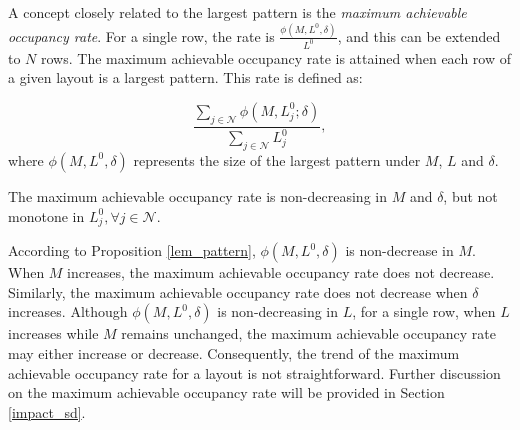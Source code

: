A concept closely related to the largest pattern is the \textit{maximum achievable occupancy rate}.
For a single row, the rate is $\frac{\phi(M, L^{0}, \delta)}{L^{0}}$, and this can be extended to $N$ rows. The maximum achievable occupancy rate is attained when each row of a given layout is a largest pattern. This rate is defined as:

$$\frac{\sum_{j \in \mathcal{N}}\phi(M, L_{j}^{0}; \delta)}{\sum_{j \in \mathcal{N}} L_{j}^{0}},$$
where $\phi(M, L^{0}, \delta)$ represents the size of the largest pattern under $M$, $L$ and $\delta$.

\begin{corollary}\label{maximum_phi}
The maximum achievable occupancy rate is non-decreasing in $M$ and $\delta$, but not monotone in $L_{j}^{0}, \forall j \in \mathcal{N}$.
\end{corollary}


According to Proposition \ref{lem_pattern}, $\phi(M, L^{0}, \delta)$ is non-decrease in $M$. When $M$ increases, the maximum achievable occupancy rate does not decrease. Similarly, the maximum achievable occupancy rate does not decrease when $\delta$ increases. Although $\phi(M, L^{0}, \delta)$ is non-decreasing in $L$, for a single row, when $L$ increases while $M$ remains unchanged, the maximum achievable occupancy rate may either increase or decrease. Consequently, the trend of the maximum achievable occupancy rate for a layout is not straightforward. Further discussion on the maximum achievable occupancy rate will be provided in Section \ref{impact_sd}.

